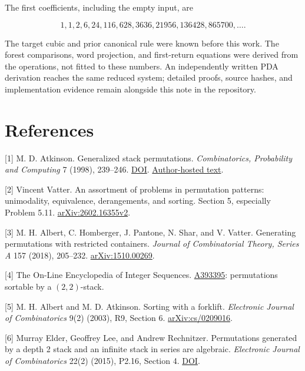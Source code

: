 \documentclass[11pt,letterpaper]{article}
\begin{document}
The first coefficients, including the empty input, are

\[1,1,2,6,24,116,628,3636,21956,136428,865700,\ldots.\]

The target cubic and prior canonical rule were known before this work.
The forest comparisons, word projection, and first-return equations were
derived from the operations, not fitted to these numbers. An
independently written PDA derivation reaches the same reduced system;
detailed proofs, source hashes, and implementation evidence remain
alongside this note in the repository. 

\begingroup\small
\section{References}\label{references}

{[}1{]} M. D. Atkinson. Generalized stack permutations.
\emph{Combinatorics, Probability and Computing} 7 (1998), 239--246.
\href{https://doi.org/10.1017/S096354839800354X}{DOI}.
\href{https://www.cs.otago.ac.nz/staffpriv/mike/Papers/Genstack/Genstack.pdf}{Author-hosted
text}.

{[}2{]} Vincent Vatter. An assortment of problems in permutation
patterns: unimodality, equivalence, derangements, and sorting. Section
5, especially Problem 5.11.
\href{https://arxiv.org/html/2602.16355v2}{arXiv:2602.16355v2}.

{[}3{]} M. H. Albert, C. Homberger, J. Pantone, N. Shar, and V. Vatter.
Generating permutations with restricted containers. \emph{Journal of
Combinatorial Theory, Series A} 157 (2018), 205--232.
\href{https://arxiv.org/html/1510.00269}{arXiv:1510.00269}.

{[}4{]} The On-Line Encyclopedia of Integer Sequences.
\href{https://oeis.org/A393395}{A393395}: permutations sortable by a
\((2,2)\)-stack.

{[}5{]} M. H. Albert and M. D. Atkinson. Sorting with a forklift.
\emph{Electronic Journal of Combinatorics} 9(2) (2003), R9, Section 6.
\href{https://arxiv.org/abs/cs/0209016}{arXiv:cs/0209016}.

{[}6{]} Murray Elder, Geoffrey Lee, and Andrew Rechnitzer. Permutations
generated by a depth 2 stack and an infinite stack in series are
algebraic. \emph{Electronic Journal of Combinatorics} 22(2) (2015),
P2.16, Section 4. \href{https://doi.org/10.37236/4571}{DOI}.

\endgroup
\end{document}
